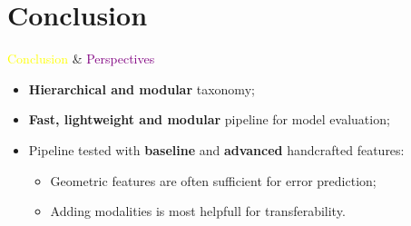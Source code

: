 \documentclass[10pt]{beamer}
\begin{document}
    \section{Conclusion}
        \begin{frame}{\textcolor{yellow}{Conclusion} \& \textcolor{purple}{Perspectives}}
            \begin{itemize}[label=\(\blacktriangleright\), font=\color{yellow}, itemsep=2em]
                \item<1-> \textbf{Hierarchical and modular} taxonomy;
                \item<2-> \textbf{Fast, lightweight and modular} pipeline for model evaluation;
                \item<3-> Pipeline tested with \textbf{baseline} and \textbf{advanced} handcrafted features:
                    \begin{itemize}[label=\(\blacktriangleright\), font=\color{IGNGreen}]
                        \item<4-> Geometric features are often sufficient for error prediction;
                        \item<5-> Adding modalities is most helpfull for transferability.
                    \end{itemize}
            \end{itemize}
        \end{frame}
\end{document}
